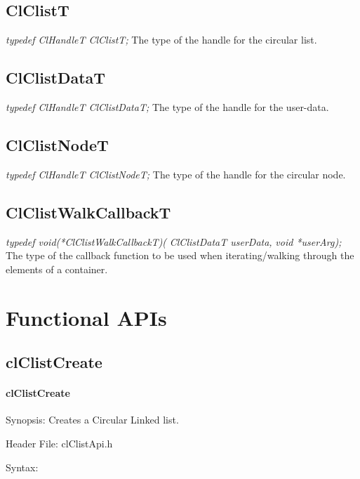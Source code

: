 \begin{flushleft}
\subsection{ClClistT}
\textit{typedef ClHandleT ClClistT;}
\newline
\newline
The type of the handle for the circular list.

\subsection{ClClistDataT}
\textit{typedef ClHandleT ClClistDataT;}
\newline
\newline
The type of the handle for the user-data.


\subsection{ClClistNodeT}
\textit{typedef ClHandleT ClClistNodeT;}
\newline
\newline
The type of the handle for the circular node.



\subsection{ClClistWalkCallbackT}
\textit{typedef void(*ClClistWalkCallbackT)(}
\newline \textit{ClClistDataT userData, }
\newline \textit{void *userArg);}
\newline
\newline
The type of the callback function to be used when iterating/walking through the elements of a container. 


\newpage

\section{Functional APIs}
\subsection{clClistCreate}
\hypertarget{pagecl101}{}\paragraph{cl\-Clist\-Create}\label{pagecl101}
\begin{Desc}
\item[Synopsis:]Creates a Circular Linked list.\end{Desc}
\begin{Desc}
\item[Header File:]clClistApi.h\end{Desc}
\begin{Desc}
\item[Syntax:]


\end{Desc}
\end{flushleft}
